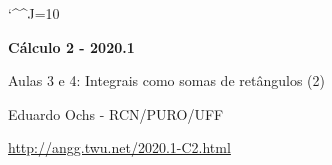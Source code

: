 \documentclass[oneside,12pt]{article}
\begin{document}
\catcode`\^^J=10


\long{}
\long{}
\long{}
\long{}
\long{}
\long{}
\long{}
\long{}
\long{}
\long{}

\long{}
\long{}

\def\frown{\ensuremath{{=}{(}}}
\def\True {\mathbf{V}}
\def\False{\mathbf{F}}
\def\sup  {\mathsf{sup}}
\def\inf  {\mathsf{inf}}

\def\drafturl{http://angg.twu.net/LATEX/2020-1-C2.pdf}
\def\drafturl{http://angg.twu.net/2020.1-C2.html}
\def\draftfooter{\tiny \href{\drafturl}{\jobname{}} \ColorBrown{\shorttoday{} \hours}}



%

\thispagestyle{empty}

\begin{center}

\vspace*{1.2cm}

{\bf \Large Cálculo 2 - 2020.1}

\bsk

Aulas 3 e 4: Integrais como somas de retângulos (2)

\bsk

Eduardo Ochs - RCN/PURO/UFF

\url{http://angg.twu.net/2020.1-C2.html}

\end{center}
\end{document}
